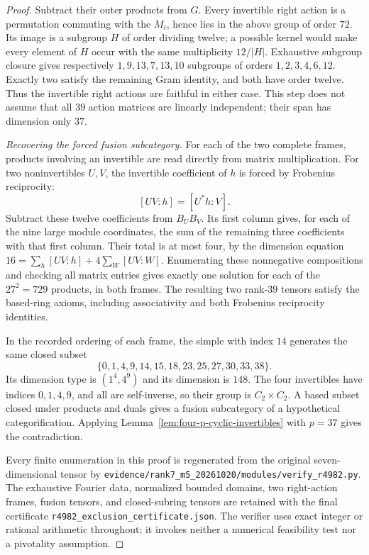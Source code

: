 \begin{proof}
Subtract their outer products from $G$. Every invertible right
action is a permutation commuting with the $M_i$, hence lies in
the above group of order $72$. Its image is a subgroup $H$ of order
dividing twelve; a possible kernel would make every element of $H$
occur with the same multiplicity $12/|H|$. Exhaustive subgroup
closure gives respectively $1,9,13,7,13,10$ subgroups of orders
$1,2,3,4,6,12$. Exactly two satisfy the remaining Gram identity,
and both have order twelve. Thus the invertible right actions are
faithful in either case. This step does not assume that all $39$
action matrices are linearly independent; their span has dimension
only $37$.

\emph{Recovering the forced fusion subcategory.}
For each of the two complete frames, products involving an
invertible are read directly from matrix multiplication. For two
noninvertibles $U,V$, the invertible coefficient of $h$ is forced
by Frobenius reciprocity:
\[
 [UV:h]=[U^*h:V].
\]
Subtract these twelve coefficients from $B_UB_V$. Its first
column gives, for each of the nine large module coordinates, the
sum of the remaining three coefficients with that first column.
Their total is at most four, by the dimension equation
$16=\sum_h[UV:h]+4\sum_W[UV:W]$.
Enumerating these nonnegative compositions and checking all matrix
entries gives exactly one solution for each of the $27^2=729$
products, in both frames. The resulting two rank-$39$ tensors
satisfy the based-ring axioms, including associativity and both
Frobenius reciprocity identities.

In the recorded ordering of each frame, the simple with index $14$
generates the same closed subset
\[
 \{0,1,4,9,14,15,18,23,25,27,30,33,38\}.
\]
Its dimension type is $(1^4,4^9)$ and its dimension is $148$.
The four invertibles have indices $0,1,4,9$, and all are
self-inverse, so their group is $C_2\times C_2$.
A based subset closed under products and duals gives a fusion
subcategory of a hypothetical categorification. Applying
Lemma~\ref{lem:four-p-cyclic-invertibles} with $p=37$ gives the
contradiction.

Every finite enumeration in this proof is regenerated from the
original seven-dimensional tensor by
\texttt{evidence/rank7\_m5\_20261020/modules/verify\_r4982.py}.
The exhaustive Fourier data, normalized bounded domains, two
right-action frames, fusion tensors, and closed-subring tensors
are retained with the final certificate
\texttt{r4982\_exclusion\_certificate.json}. The verifier uses exact
integer or rational arithmetic throughout; it invokes neither a
numerical feasibility test nor a pivotality assumption.
\end{proof}

